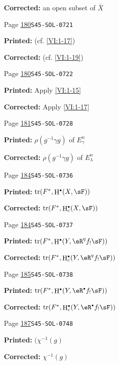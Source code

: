 \documentclass[oneside]{book}
\DeclareMathOperator{\h}{H}
\DeclareMathOperator{\tr}{tr}
\theoremstyle{sga-source}
\theoremstyle{sga-source-dash}
\theoremstyle{sga-source-dotdash}
\theoremstyle{sga-source-number-note-dash}
\theoremstyle{sga-source-note-number-dotdash}
\theoremstyle{sga-source-example-dotdash}
\theoremstyle{sga-source-inline-number}
\theoremstyle{sga-source-bare-number}
\theoremstyle{sga-source}
\let\oldbullet\bullet
\renewcommand{\bullet}{\textnormal{\tiny$\oldbullet$}}
\begin{document}
\begin{description}
\par\noindent\textbf{Corrected:} an open subset of $\bar X$
\smallskip
\item[\hypertarget{apparatus:EN-0106}{106}] Page \hyperlink{printpage:en:180}{180}\quad\texttt{S45-SOL-0721}
\par\noindent\textbf{Printed:} (cf. \ref{VI:1-17})
\par\noindent\textbf{Corrected:} (cf. \ref{VI:1-19})
\smallskip
\item[\hypertarget{apparatus:EN-0107}{107}] Page \hyperlink{printpage:en:180}{180}\quad\texttt{S45-SOL-0722}
\par\noindent\textbf{Printed:} Apply \ref{VI:1-15}
\par\noindent\textbf{Corrected:} Apply \ref{VI:1-17}
\smallskip
\item[\hypertarget{apparatus:EN-0108}{108}] Page \hyperlink{printpage:en:181}{181}\quad\texttt{S45-SOL-0728}
\par\noindent\textbf{Printed:} $\rho(g^{-1} \gamma g)$ of $E_\gamma^n$
\par\noindent\textbf{Corrected:} $\rho(g^{-1} \gamma g)$ of $E_\lambda^n$
\smallskip
\item[\hypertarget{apparatus:EN-0109}{109}] Page \hyperlink{printpage:en:184}{184}\quad\texttt{S45-SOL-0736}
\par\noindent\textbf{Printed:} \(\tr(F^\ast,\h^\bullet(X,\sF))\)
\par\noindent\textbf{Corrected:} \(\tr(F^\ast,\h_c^\bullet(X,\sF))\)
\smallskip
\item[\hypertarget{apparatus:EN-0110}{110}] Page \hyperlink{printpage:en:184}{184}\quad\texttt{S45-SOL-0737}
\par\noindent\textbf{Printed:} \(\tr(F^\ast, \h^\bullet(Y,\eR^q f_! \sF))\)
\par\noindent\textbf{Corrected:} \(\tr(F^\ast,\h_c^\bullet(Y,\eR^q f_! \sF))\)
\smallskip
\item[\hypertarget{apparatus:EN-0111}{111}] Page \hyperlink{printpage:en:185}{185}\quad\texttt{S45-SOL-0738}
\par\noindent\textbf{Printed:} \(\tr(F^\ast,\h^\bullet(Y,\eR^\bullet f_! \sF))\)
\par\noindent\textbf{Corrected:} \(\tr(F^\ast,\h_c^\bullet(Y,\eR^\bullet f_! \sF))\)
\smallskip
\item[\hypertarget{apparatus:EN-0112}{112}] Page \hyperlink{printpage:en:187}{187}\quad\texttt{S45-SOL-0748}
\par\noindent\textbf{Printed:} \((\chi^{-1}(g)\)
\par\noindent\textbf{Corrected:} \(\chi^{-1}(g)\)

\end{description}
\end{document}

